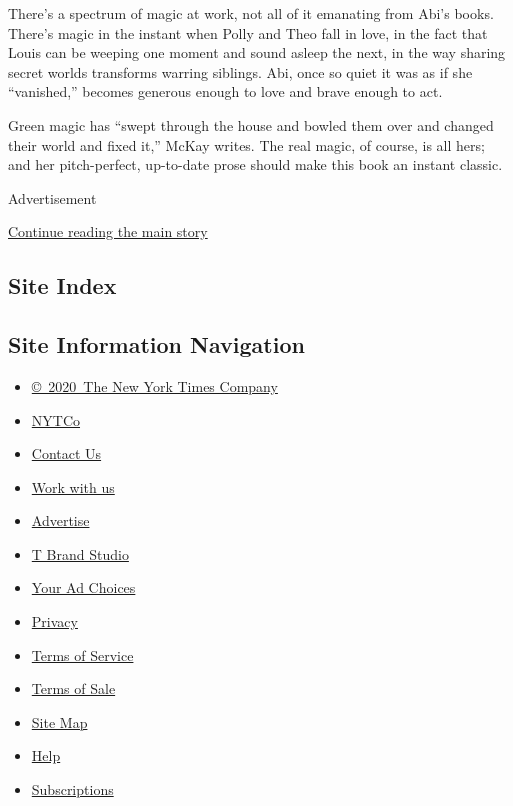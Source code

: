 There's a spectrum of magic at work, not all of it emanating from Abi's
books. There's magic in the instant when Polly and Theo fall in love, in
the fact that Louis can be weeping one moment and sound asleep the next,
in the way sharing secret worlds transforms warring siblings. Abi, once
so quiet it was as if she ``vanished,'' becomes generous enough to love
and brave enough to act.

Green magic has ``swept through the house and bowled them over and
changed their world and fixed it,'' McKay writes. The real magic, of
course, is all hers; and her pitch-perfect, up-to-date prose should make
this book an instant classic.

Advertisement

\protect\hyperlink{after-bottom}{Continue reading the main story}

\hypertarget{site-index}{%
\subsection{Site Index}\label{site-index}}

\hypertarget{site-information-navigation}{%
\subsection{Site Information
Navigation}\label{site-information-navigation}}

\begin{itemize}
\tightlist
\item
  \href{https://help.nytimes3xbfgragh.onion/hc/en-us/articles/115014792127-Copyright-notice}{©~2020~The
  New York Times Company}
\end{itemize}

\begin{itemize}
\tightlist
\item
  \href{https://www.nytco.com/}{NYTCo}
\item
  \href{https://help.nytimes3xbfgragh.onion/hc/en-us/articles/115015385887-Contact-Us}{Contact
  Us}
\item
  \href{https://www.nytco.com/careers/}{Work with us}
\item
  \href{https://nytmediakit.com/}{Advertise}
\item
  \href{http://www.tbrandstudio.com/}{T Brand Studio}
\item
  \href{https://www.nytimes3xbfgragh.onion/privacy/cookie-policy\#how-do-i-manage-trackers}{Your
  Ad Choices}
\item
  \href{https://www.nytimes3xbfgragh.onion/privacy}{Privacy}
\item
  \href{https://help.nytimes3xbfgragh.onion/hc/en-us/articles/115014893428-Terms-of-service}{Terms
  of Service}
\item
  \href{https://help.nytimes3xbfgragh.onion/hc/en-us/articles/115014893968-Terms-of-sale}{Terms
  of Sale}
\item
  \href{https://spiderbites.nytimes3xbfgragh.onion}{Site Map}
\item
  \href{https://help.nytimes3xbfgragh.onion/hc/en-us}{Help}
\item
  \href{https://www.nytimes3xbfgragh.onion/subscription?campaignId=37WXW}{Subscriptions}
\end{itemize}
